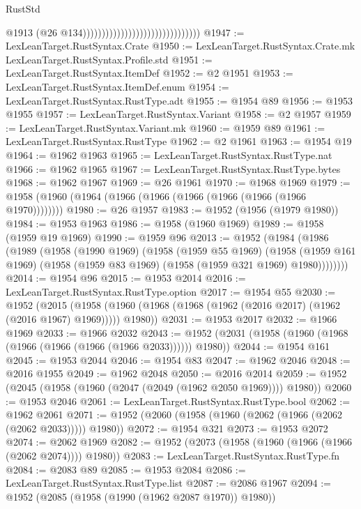 \begin{lexlean}{RustStd}
\begin{coremodule}
                                                                @1913
                                                                (@26
                                                                  @134)))))))))))))))))))))))))))))))
@1947 := LexLeanTarget.RustSyntax.Crate
@1950 := LexLeanTarget.RustSyntax.Crate.mk LexLeanTarget.RustSyntax.Profile.std
@1951 := LexLeanTarget.RustSyntax.ItemDef
@1952 := @2 @1951
@1953 := LexLeanTarget.RustSyntax.ItemDef.enum
@1954 := LexLeanTarget.RustSyntax.RustType.adt
@1955 := @1954 @89
@1956 := @1953 @1955
@1957 := LexLeanTarget.RustSyntax.Variant
@1958 := @2 @1957
@1959 := LexLeanTarget.RustSyntax.Variant.mk
@1960 := @1959 @89
@1961 := LexLeanTarget.RustSyntax.RustType
@1962 := @2 @1961
@1963 := @1954 @19
@1964 := @1962 @1963
@1965 := LexLeanTarget.RustSyntax.RustType.nat
@1966 := @1962 @1965
@1967 := LexLeanTarget.RustSyntax.RustType.bytes
@1968 := @1962 @1967
@1969 := @26 @1961
@1970 := @1968 @1969
@1979 := @1958 (@1960 (@1964 (@1966 (@1966 (@1966 (@1966 (@1966 (@1966 @1970))))))))
@1980 := @26 @1957
@1983 := @1952 (@1956 (@1979 @1980))
@1984 := @1953 @1963
@1986 := @1958 (@1960 @1969)
@1989 := @1958 (@1959 @19 @1969)
@1990 := @1959 @96
@2013 := @1952
    (@1984
      (@1986
        (@1989
          (@1958
            (@1990 @1969)
            (@1958
              (@1959 @55 @1969)
              (@1958
                (@1959 @161 @1969)
                (@1958 (@1959 @83 @1969) (@1958 (@1959 @321 @1969) @1980))))))))
@2014 := @1954 @96
@2015 := @1953 @2014
@2016 := LexLeanTarget.RustSyntax.RustType.option
@2017 := @1954 @55
@2030 := @1952
    (@2015 (@1958 (@1960 (@1968 (@1968 (@1962 (@2016 @2017) (@1962 (@2016 @1967) @1969))))) @1980))
@2031 := @1953 @2017
@2032 := @1966 @1969
@2033 := @1966 @2032
@2043 := @1952 (@2031 (@1958 (@1960 (@1968 (@1966 (@1966 (@1966 (@1966 @2033)))))) @1980))
@2044 := @1954 @161
@2045 := @1953 @2044
@2046 := @1954 @83
@2047 := @1962 @2046
@2048 := @2016 @1955
@2049 := @1962 @2048
@2050 := @2016 @2014
@2059 := @1952 (@2045 (@1958 (@1960 (@2047 (@2049 (@1962 @2050 @1969)))) @1980))
@2060 := @1953 @2046
@2061 := LexLeanTarget.RustSyntax.RustType.bool
@2062 := @1962 @2061
@2071 := @1952 (@2060 (@1958 (@1960 (@2062 (@1966 (@2062 (@2062 @2033))))) @1980))
@2072 := @1954 @321
@2073 := @1953 @2072
@2074 := @2062 @1969
@2082 := @1952 (@2073 (@1958 (@1960 (@1966 (@1966 (@2062 @2074)))) @1980))
@2083 := LexLeanTarget.RustSyntax.RustType.fn
@2084 := @2083 @89
@2085 := @1953 @2084
@2086 := LexLeanTarget.RustSyntax.RustType.list
@2087 := @2086 @1967
@2094 := @1952 (@2085 (@1958 (@1990 (@1962 @2087 @1970)) @1980))

\end{coremodule}
\end{lexlean}
